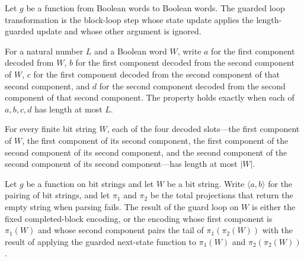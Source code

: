 \begin{definition}
\label{Complexity.BinArith.guardLoop}
\leanok
{}
Let $g$ be a function from Boolean words to Boolean words. The guarded loop
transformation is the block-loop step whose state update applies the length-guarded
update and whose other argument is ignored.
\end{definition}

\begin{definition}
\label{Complexity.BinArith.SlotsLe}
\leanok
{}
For a natural number $L$ and a Boolean word $W$, write $a$ for the first component
decoded from $W$, $b$ for the first component decoded from the second component of $W$,
$c$ for the first component decoded from the second component of that second component,
and $d$ for the second component decoded from the second component of that second
component. The property holds exactly when each of $a,b,c,d$ has length at most $L$.
\end{definition}

\begin{theorem}
\label{Complexity.BinArith.slotsLe_self}
\leanok
{}
For every finite bit string $W$, each of the four decoded slots—the first component of
$W$, the first component of its second component, the first component of the second
component of its second component, and the second component of the second component of
its second component—has length at most $|W|$.
\end{theorem}

\begin{theorem}
\label{Complexity.BinArith.guardLoop_cases}
\leanok
{}
Let $g$ be a function on bit strings and let $W$ be a bit string. Write $\langle
a,b\rangle$ for the pairing of bit strings, and let $\pi_1$ and $\pi_2$ be the total
projections that return the empty string when parsing fails. The result of the guard
loop on $W$ is either the fixed completed-block encoding, or the encoding whose first
component is $\pi_1(W)$ and whose second component pairs the tail of $\pi_1(\pi_2(W))$
with the result of applying the guarded next-state function to $\pi_1(W)$ and
$\pi_2(\pi_2(W))$.
\end{theorem}

